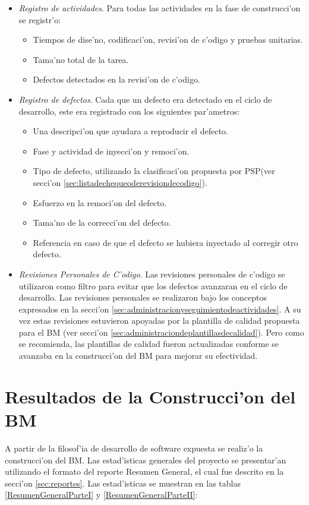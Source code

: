 \begin{itemize}
	\item \emph{Registro de actividades}. Para todas las actividades en la fase de construcci'on se registr'o:
	\begin{itemize}
		\item Tiempos de dise'no, codificaci'on, revisi'on de c'odigo y pruebas unitarias.
		\item Tama'no total de la tarea.
		\item Defectos detectados en la revisi'on de c'odigo.
	\end{itemize}
	\item \emph{Registro de defectos}. Cada que un defecto era detectado en el ciclo de desarrollo, este era registrado con los siguientes par'ametros:
	\begin{itemize}
		\item Una descripci'on que ayudara a reproducir el defecto.
		\item Fase y actividad de inyecci'on y remoci'on.
		\item Tipo de defecto, utilizando la clasificaci'on propuesta por PSP\cite{Humphrey}(ver secci'on \ref{sec:listadechequeoderevisiondecodigo}).
		\item Esfuerzo en la remoci'on del defecto.
		\item Tama'no de la correcci'on del defecto.
		\item Referencia en caso de que el defecto se hubiera inyectado al corregir otro defecto.
	\end{itemize}
	\item \emph{Revisiones Personales de C'odigo}. Las revisiones personales de c'odigo se utilizaron como filtro para evitar que los defectos avanzaran en el ciclo de desarrollo. Las revisiones personales se realizaron bajo los conceptos expresados en la secci'on \ref{sec:administracionyseguimientodeactividades}. A su vez estas revisiones estuvieron apoyadas por la plantilla de calidad propuesta para el BM (ver secci'on \ref{sec:administraciondeplantillasdecalidad}). Pero como se recomienda, las plantillas de calidad fueron actualizadas conforme se avanzaba en la construcci'on del BM para mejorar su efectividad.
\end{itemize}

\section{Resultados de la Construcci'on del BM}
\label{sec:ResultadosdelaConstrucciondelBM}
\noindent
A partir de la filosof'ia de desarrollo de software expuesta se realiz'o la construcci'on del BM. Las estad'isticas generales del proyecto se presentar'an utilizando el formato del reporte Resumen General, el cual fue descrito en la secci'on \ref{sec:reportes}. Las estad'isticas se muestran en las tablas \ref{ResumenGeneralParteI} y \ref{ResumenGeneralParteII}:

